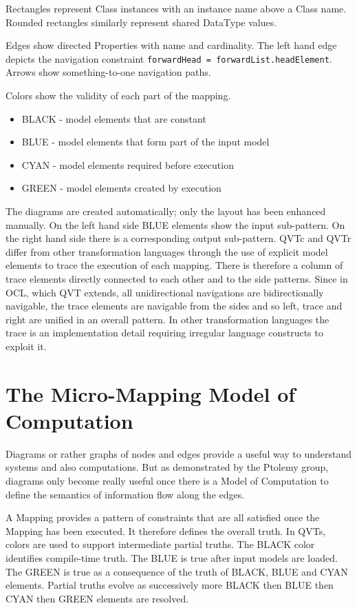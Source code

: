 \documentclass[conference]{IEEEtran}
\begin{document}
Rectangles represent Class instances with an instance name above a Class name. Rounded rectangles similarly represent shared DataType values.

Edges show directed Properties with  name and cardinality. The left hand edge depicts the navigation constraint \verb|forwardHead = forwardList.headElement|. Arrows show something-to-one navigation paths.

Colors show the validity of each part of the mapping.

\begin{itemize}
\item BLACK - model elements that are constant
\item BLUE - model elements that form part of the input model
\item CYAN - model elements required before execution
\item GREEN - model elements created by execution
\end{itemize} 

The diagrams are created automatically; only the layout has been enhanced manually. On the left hand side BLUE elements show the input sub-pattern. On the right hand side there is a corresponding output sub-pattern. QVTc and QVTr differ from other transformation languages through the use of explicit model elements to trace the execution of each mapping. There is therefore a column of trace elements directly connected to each other and to the side patterns. Since in OCL, which QVT extends, all unidirectional navigations are bidirectionally navigable, the trace elements are navigable from the sides and so left, trace and right are unified in an overall pattern. In other transformation languages the trace is an implementation detail requiring irregular language constructs to exploit it.

\section{The Micro-Mapping Model of Computation}\label{The Micro-Mapping Model of Computation}

Diagrams or rather graphs of nodes and edges provide a useful way to understand systems and also computations. But as demonstrated by the Ptolemy group, diagrams only become really useful once there is a Model of Computation \cite{moc} to define the semantics of information flow along the edges.%

A Mapping provides a pattern of constraints that are all satisfied once the Mapping has been executed. It therefore defines the overall truth. In QVTs, colors are used to support intermediate partial truths. The BLACK color identifies compile-time truth. The BLUE is true after input models are loaded. The GREEN  is true as a consequence of the truth of BLACK, BLUE and CYAN elements. Partial truths evolve as successively more BLACK then BLUE then CYAN then GREEN elements are resolved.
\end{document}
